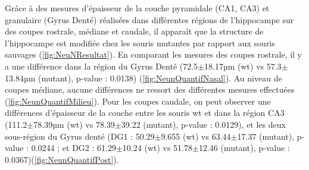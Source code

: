 	Grâce à des mesures d'épaisseur de la couche pyramidale (CA1, CA3) et granulaire (Gyrus Denté) réalisées dans différentes régions de l'hippocampe sur des coupes rostrale, médiane et caudale, il apparaît que la structure de l'hippocampe est modifiée chez les souris mutantes par rapport aux souris sauvages (\cref{fig:NeuNResultat}). En comparant les mesures des coupes rostrale, il y a une différence dans la région du Gyrus Denté (72.5$\pm$18.17µm (\acrshort{wt}) vs 57.3$\pm$13.84µm (mutant), p-value : 0.0138) (\cref{fig:NeunQuantifNasal}).  Au niveau de coupes médiane, aucune différences ne ressort des différentes mesures effectuées (\cref{fig:NeunQuantifMilieu}). Pour les coupes caudale, on peut observer une différences d'épaisseur de la couche entre les souris \gls{wt} et \mcrd dans la région CA3 (111.2$\pm$78.39µm (\acrshort{wt}) vs 78.39$\pm$39.22 (mutant), p-value : 0.0129), et les deux sous-région du Gyrus denté (DG1 : 50.29$\pm$9.655 (\acrshort{wt}) vs 63.44$\pm$17.37 (mutant), p-value : 0.0244 ; et DG2 : 61.29$\pm$10.24 (\acrshort{wt}) vs 51.78$\pm$12.46 (mutant), p-value : 0.0367)(\cref{fig:NeunQuantifPost}).
	

